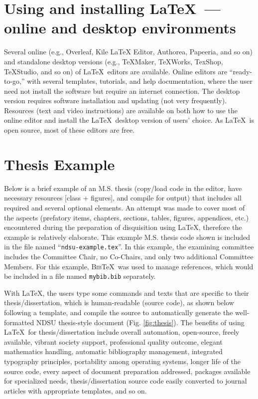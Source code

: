 \documentclass[letterpaper]{refart}
\begin{document}
\section{Using and installing \LaTeX\  --- online and desktop environments}  
Several online (e.g., Overleaf, Kile LaTeX Editor, Authorea, Papeeria, and so on) and standalone desktop versions (e.g., TeXMaker, TeXWorks, TexShop, TeXStudio, and so on) of \LaTeX\ editors are available. Online editors are ``ready-to-go,'' with several templates, tutorials, and help documentation, where the user need not install the software but require an internet connection. The desktop version requires software installation and updating (not very frequently). Resources (text and video instructions) are available on both how to use the online editor and install the \LaTeX\ desktop version of users' choice. As \LaTeX\ is open source, most of these editors are free.

\section{Thesis Example}\label{example}
Below is a brief example of an M.S. thesis (copy/load code in the editor, have necessary resources [class + figures], and compile for output) that includes all required and several optional elements. An attempt was made to cover most of the aspects (prefatory items, chapters, sections, tables, figures, appendices, etc.) encountered during the preparation of disquisition using \LaTeX, therefore the example is relatively elaborate. This example M.S. thesis code shown is included in the file named ``\texttt{ndsu-example.tex}''. In this example, the examining committee includes the Committee Chair, no Co-Chairs, and only two additional Committee Members. For this example, \textsc{Bib}\TeX\ was used to manage references, which would be included in a file named \texttt{mybib.bib} separately.

With \LaTeX, the users type some commands and texts that are specific to their thesis/dissertation, which is human-readable (source code), as shown below following a template, and compile the source to automatically generate the well-formatted NDSU thesis-style document (Fig. \ref{fig:thesis}). The benefits of using \LaTeX\ for thesis/dissertation include overall automation, open-source, freely available, vibrant society support, professional quality outcome, elegant mathematics handling, automatic bibliography management, integrated typography principles, portability among operating systems, longer life of the source code, every aspect of document preparation addressed, packages available for specialized needs, thesis/dissertation source code easily converted to journal articles with appropriate templates, and so on.        
\end{document}
